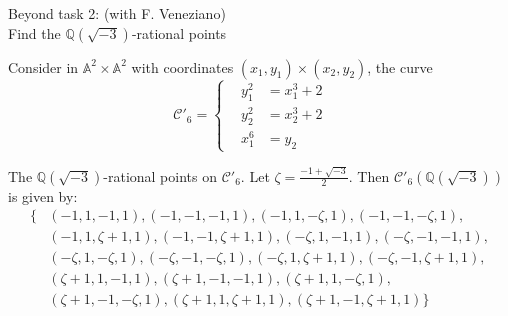 \documentclass[12pt]{beamer}
\newcommand{\qe}{\mathbb{Q}}
\newcommand{\Ci}{\mathcal{C}}
\begin{document}
 \begin{frame}{Beyond task 2: (with F. Veneziano)\\
 Find the  $\qe(\sqrt{-3})$-rational points}
\begin{example}
Consider in $\mathbb{A}^2\times\mathbb{A}^2$ with coordinates  $(x_1,y_1)\times (x_2,y_2)$, the curve
\begin{equation*}
\mathcal{C}'_6=\begin{cases}
\,\,\,\,\,y_1^2&=x_1^3+2\,\,\,\,\,\,\,\,\\
\,\,\,\,\,y_2^2&=x_2^3+2\,\,\,\,\,\,\,\,\\
\,\,\,\,\,x_1^6&=y_2
\end{cases}
\end{equation*}
\pause

 \begin{alertblock}{The $\mathbb{Q}(\sqrt{-3})$-rational points on $\mathcal{C}'_6$.}
 Let $\zeta=\frac{-1+\sqrt{-3}}{2}$. Then $\Ci'_6(\qe(\sqrt{-3}))$ is given by:
 \vspace{-0.2cm}
  \[ \begin{aligned} \{&(-1,1,-1,1), (-1,-1,-1,1), 
  (-1,1,-\zeta,1), (-1,-1,-\zeta,1),\\
  &(-1,1,\zeta+1,1), (-1,-1,\zeta+1,1),
  (-\zeta,1,-1,1), (-\zeta,-1,-1,1), \\
  &(-\zeta,1,-\zeta,1), (-\zeta,-1,-\zeta,1),
  (-\zeta,1,\zeta+1,1), (-\zeta,-1,\zeta+1,1),\\
  &(\zeta+1,1,-1,1), (\zeta+1,-1,-1,1), 
  (\zeta+1,1,-\zeta,1),\\ &(\zeta+1,-1,-\zeta,1),
  (\zeta+1,1,\zeta+1,1), (\zeta+1,-1,\zeta+1,1)
  \}	
  \end{aligned} 
  \]
  
 
 \end{alertblock}
 \end{example}
 \end{frame}
\end{document}
